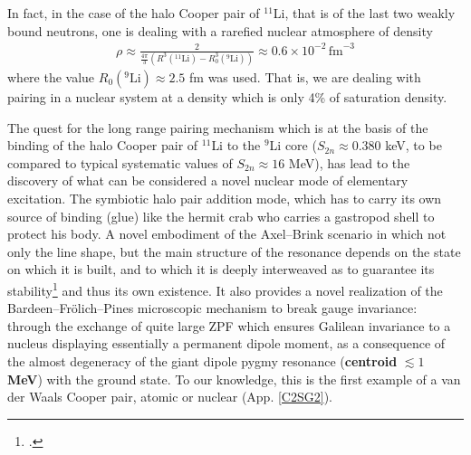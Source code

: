 \begin{subappendices}
In fact, in the case of the halo Cooper pair of $^{11}$Li, that is of the last two weakly bound neutrons, one is dealing with a rarefied nuclear atmosphere of density
\begin{align}\label{eq5App3E}
\rho\approx\frac{2}{\frac{4\pi}{3}(R^3(^{11}\text{Li})-R_0^3(^{9}\text{Li}))}\approx 0.6\times 10^{-2}\,\text{fm}^{-3}
\end{align}
where the value $R_0(^9\text{Li})\approx 2.5$ fm was used. That is, we are dealing with pairing in a nuclear system at a density which is only 4\% of saturation density.

The quest for the long range pairing mechanism which is at the basis of the binding of the halo Cooper pair of $^{11}$Li to the $^9$Li core ($S_{2n}\approx0.380$ keV, to be compared to typical systematic values of $S_{2n}\approx 16$ MeV), has lead to the discovery of what can be considered a novel nuclear mode of elementary excitation. The symbiotic halo pair addition mode, which has to carry its own source of binding (glue) like the hermit crab who carries a gastropod shell to protect his body. A novel embodiment of the Axel--Brink scenario in which not only the line shape, but the main structure of the resonance depends on the state on which it is built, and to which it is deeply interweaved as to guarantee its stability\footnote{\cite{Axel:62,Brink:55}.} and thus its own existence. It also provides a novel realization of the Bardeen--Fr\"olich--Pines microscopic mechanism to break gauge invariance: through the exchange of quite large ZPF which ensures Galilean invariance to a nucleus displaying essentially a permanent dipole moment, as a consequence of the almost degeneracy of the giant dipole pygmy resonance (\textbf{centroid} $\lesssim 1$ \textbf{MeV}) with the ground state. To our knowledge, this is the first example of a van der Waals Cooper pair, atomic or nuclear (App. \ref{C2SG2}).



\end{subappendices}
